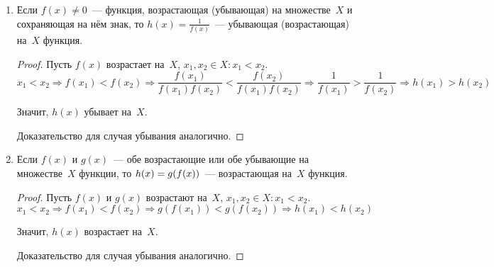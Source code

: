 \begin{enumerate}
\begin{proof}
	Значит, $h(x)$ убывает на~$X$.
	
	Доказательства для остальных трёх случаев аналогичны.
	\end{proof}
	
	\item Если $f(x) \neq 0$~--- функция, возрастающая (убывающая) на множестве~$X$ и сохраняющая на нём знак, то $h(x) = \frac1{f(x)}$~--- убывающая (возрастающая) на~$X$ функция.
	\begin{proof}
	Пусть $f(x)$ возрастает на~$X$, $x_1, x_2 \in X \colon x_1 < x_2$.
	\begin{equation*}
	x_1 < x_2 \Rightarrow
	f(x_1) < f(x_2) \Rightarrow
	\frac{f(x_1)}{f(x_1)f(x_2)} < \frac{f(x_2)}{f(x_1)f(x_2)} \Rightarrow
	\frac1{f(x_1)} > \frac1{f(x_2)} \Rightarrow
	h(x_1) > h(x_2)
	\end{equation*}
	
	Значит, $h(x)$ убывает на~$X$.
		
	Доказательство для случая убывания аналогично.
	\end{proof}
	
	\item Если $f(x)$ и $g(x)$~--- обе возрастающие или обе убывающие на множестве~$X$ функции, то $h(x) \opbr= g(f(x))$~--- возрастающая на~$X$ функция.
	\begin{proof}
	Пусть $f(x)$ и $g(x)$ возрастают на~$X$, $x_1, x_2 \in X \colon x_1 < x_2$.
	\begin{equation*}
	x_1 < x_2 \Rightarrow
	f(x_1) < f(x_2) \Rightarrow
	g(f(x_1)) < g(f(x_2)) \Rightarrow
	h(x_1) < h(x_2)
	\end{equation*}
	
	Значит, $h(x)$ возрастает на~$X$.
	
	Доказательство для случая убывания аналогично.
	\end{proof}
\end{enumerate}
